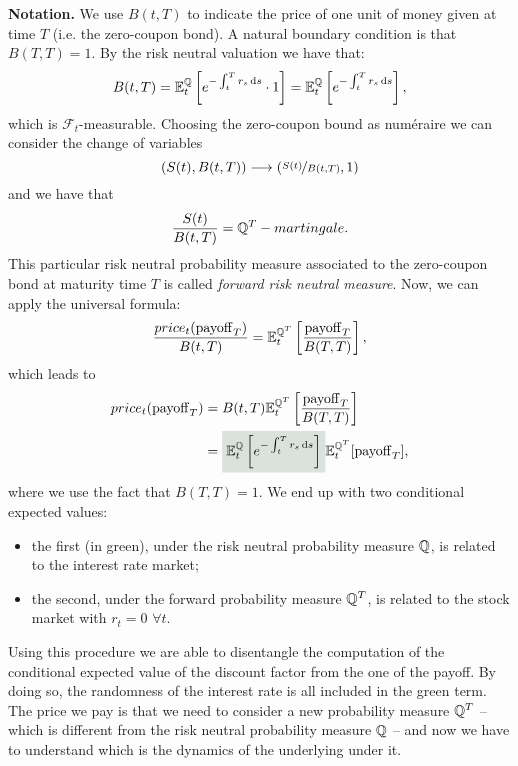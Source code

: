 \noindent\textbf{Notation.} We use $B(t,T)$ to indicate the price of one unit of money given at time $T$ (i.e. the zero-coupon bond). A natural boundary condition is that $B(T,T)=1$.
\medbreak
\noindent By the risk neutral valuation we have that:
\begin{equation}
    B(t,T) = \mathbb{E}^{\mathbb{Q}}_t\left[e^{-\int_t^T r_s\,\dd s}\cdot 1\right] = \mathbb{E}^{\mathbb{Q}}_t\left[e^{-\int_t^T r_s\,\dd s}\right],
\end{equation}
which is $\mathcal{F}_t$-measurable. Choosing the zero-coupon bound as numéraire we can consider the change of variables
\begin{equation}
    (S(t), B(t,T)) \longrightarrow (\nicefrac{S(t)}{B(t,T)},1)
\end{equation}
and we have that
\begin{equation}
    \dfrac{S(t)}{B(t,T)} = \mathbb{Q}^T-martingale.
\end{equation}
This particular risk neutral probability measure associated to the zero-coupon bond at maturity time $T$ is called \emph{forward risk neutral measure}. Now, we can apply the universal formula:
\begin{align}
    \frac{price_t(\operatorname{payoff}_T)}{B(t,T)} = \mathbb{E}^{\mathbb{Q}^T}_t\left[\frac{\operatorname{payoff}_T}{B(T,T)}\right],
\end{align}
which leads to
\begin{align}
    \notag price_t(\pay_T) &= B(t,T) \mathbb{E}^{\Qmeas^T}_t\left[\frac{\pay_T}{B(T,T)}\right] \\
    &=
    \hlc{mytweed}{\expect_t\left[e^{-\int_t^T r_s\,\dd s}\right]} \mathbb{E}^{\Qmeas^T}_t[\pay_T], \label{label1}
\end{align}
where we use the fact that $B(T,T)=1$. We end up with two conditional expected values:
\begin{itemize}
    \item the first (in green), under the risk neutral probability measure $\mathbb{Q}$, is related to the interest rate market;
    \item the second, under the forward probability measure $\mathbb{Q}^T$, is related to the stock market with $r_t = 0$ $\forall t$.
\end{itemize}
Using this procedure we are able to disentangle the computation of the conditional expected value of the discount factor from the one of the payoff. By doing so, the randomness of the interest rate is all included in the green term. The price we pay is that we need to consider a new probability measure $\mathbb{Q}^T$ -- which is different from the risk neutral probability measure $\mathbb{Q}$ -- and now we have to understand which is the dynamics of the underlying under it.\\
